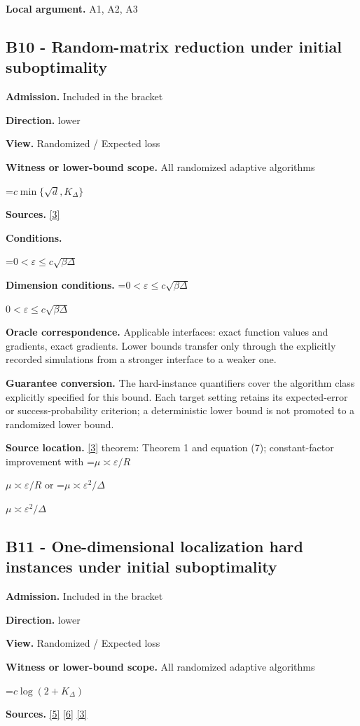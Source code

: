 \documentclass[10pt,a4paper]{article}
\newcommand{\AtlasMath}[1]{\par\begingroup\centering\setbox0=\hbox{$\displaystyle #1$}\ifdim\wd0>1.4\linewidth\typeout{ATLAS WIDE FORMULA: \the\wd0}\fi\ifdim\wd0>\linewidth\resizebox{\linewidth}{!}{\box0}\else\box0\fi\par\endgroup}
\newcommand{\AtlasInlineMath}[1]{\begingroup\setbox0=\hbox{$#1$}\ifdim\wd0>.4\linewidth\endgroup\AtlasMath{#1}\else\endgroup$#1$\fi}
\begin{document}
\textbf{Local argument.} A1, A2, A3

\subsection{B10 - Random-matrix reduction under initial suboptimality}
\textbf{Admission.} Included in the bracket

\textbf{Direction.} lower

\textbf{View.} Randomized / Expected loss

\textbf{Witness or lower-bound scope.} All randomized adaptive algorithms

\AtlasMath{c\min\{\sqrt d,K_\Delta\}}
\textbf{Sources.} \href{https://arxiv.org/pdf/2609.10874}{[3]}

\textbf{Conditions.} 
\AtlasMath{0<\varepsilon\le c\sqrt{\beta\Delta}}


\textbf{Dimension conditions.} \AtlasInlineMath{0<\varepsilon\le c\sqrt{\beta\Delta}}

\textbf{Oracle correspondence.} Applicable interfaces: exact function values and gradients, exact gradients. Lower bounds transfer only through the explicitly recorded simulations from a stronger interface to a weaker one.

\textbf{Guarantee conversion.} The hard-instance quantifiers cover the algorithm class explicitly specified for this bound. Each target setting retains its expected-error or success-probability criterion; a deterministic lower bound is not promoted to a randomized lower bound.

\textbf{Source location.} \href{https://arxiv.org/pdf/2609.10874}{[3]} theorem: Theorem 1 and equation (7); constant-factor improvement with \AtlasInlineMath{\mu\asymp\varepsilon/R} or \AtlasInlineMath{\mu\asymp\varepsilon^2/\Delta}

\subsection{B11 - One-dimensional localization hard instances under initial suboptimality}
\textbf{Admission.} Included in the bracket

\textbf{Direction.} lower

\textbf{View.} Randomized / Expected loss

\textbf{Witness or lower-bound scope.} All randomized adaptive algorithms

\AtlasMath{c\log(2+K_\Delta)}
\textbf{Sources.} \href{https://arxiv.org/pdf/2101.09740v2}{[5]} \href{https://arxiv.org/pdf/2609.33360v2}{[6]} \href{https://arxiv.org/pdf/2609.10874}{[3]}
\end{document}
